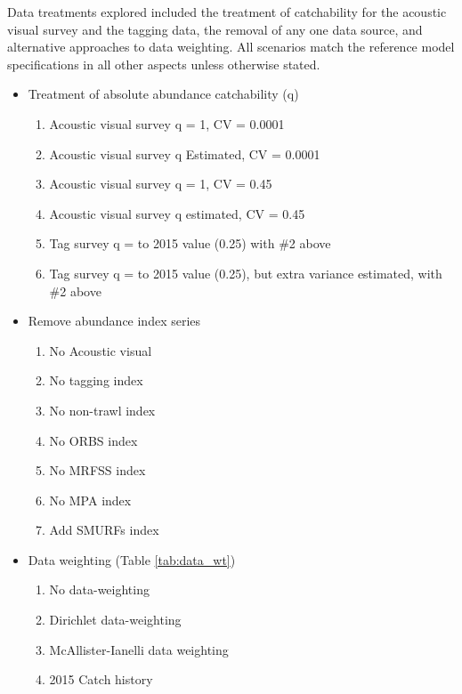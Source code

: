 \documentclass[11pt,
  letterpaper,
]{article}
\providecommand{\tightlist}{%
  \setlength{\itemsep}{0pt}\setlength{\parskip}{0pt}}
\providecommand{\tightlist}{%
  \setlength{\itemsep}{0pt}\setlength{\parskip}{0pt}}
\begin{document}
Data treatments explored included the treatment of catchability for the acoustic visual survey and the tagging data, the removal of any one data source, and alternative approaches to data weighting. All scenarios match the reference model specifications in all other aspects unless otherwise stated.

\begin{itemize}
\tightlist
\item
  Treatment of absolute abundance catchability (q)

  \begin{enumerate}
  \def\labelenumi{\arabic{enumi}.}
  \tightlist
  \item
    Acoustic visual survey q = 1, CV = 0.0001
  \item
    Acoustic visual survey q Estimated, CV = 0.0001
  \item
    Acoustic visual survey q = 1, CV = 0.45
  \item
    Acoustic visual survey q estimated, CV = 0.45
  \item
    Tag survey q = to 2015 value (0.25) with \#2 above
  \item
    Tag survey q = to 2015 value (0.25), but extra variance estimated, with \#2 above
  \end{enumerate}
\item
  Remove abundance index series

  \begin{enumerate}
  \def\labelenumi{\arabic{enumi}.}
  \setcounter{enumi}{6}
  \tightlist
  \item
    No Acoustic visual
  \item
    No tagging index
  \item
    No non-trawl index
  \item
    No ORBS index
  \item
    No MRFSS index
  \item
    No MPA index
  \item
    Add SMURFs index
  \end{enumerate}
\item
  Data weighting (Table \ref{tab:data_wt})

  \begin{enumerate}
  \def\labelenumi{\arabic{enumi}.}
  \setcounter{enumi}{13}
  \tightlist
  \item
    No data-weighting
  \item
    Dirichlet data-weighting
  \item
    McAllister-Ianelli data weighting
  \item
    2015 Catch history
  \end{enumerate}
\end{itemize}
\end{document}
